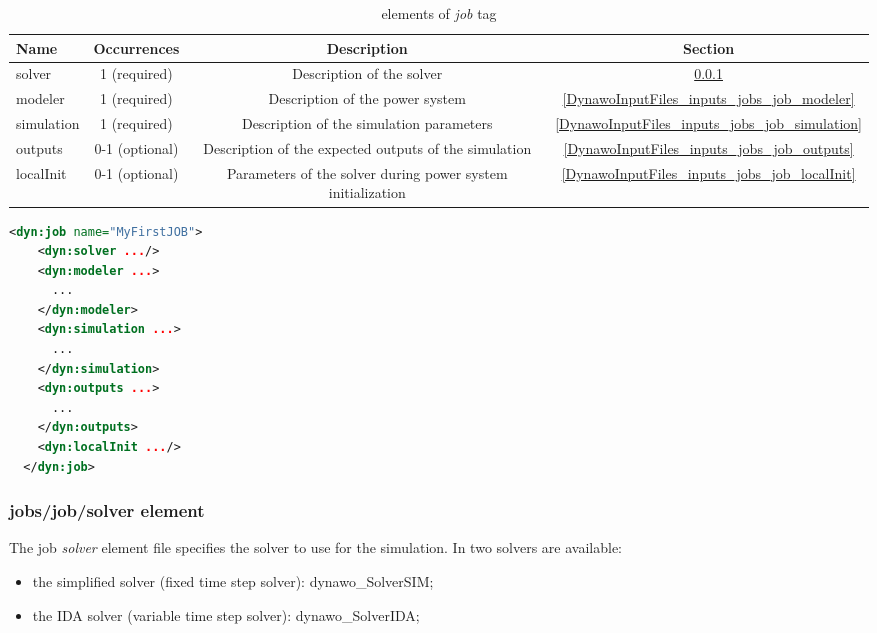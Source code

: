 \documentclass[a4paper, 12pt]{report}
\begin{document}
\begin{table}[H]
\center
\begin{tabular}{ l | c | c | c }
\toprule
\textbf{{Name}} & \textbf{{Occurrences}} & \textbf{{Description}}& \textbf{{Section}}\\
\midrule
\rowcolor{white}
\small{solver} & \small{1 (required)} & \small{Description of the solver}  & \ref{DynawoInputFiles_inputs_jobs_job_solver}\\
\rowcolor{gray!10}
\small{modeler} & \small{1 (required)} & \small{Description of the power system}  & \ref{DynawoInputFiles_inputs_jobs_job_modeler}\\
\rowcolor{white}
\small{simulation} & \small{1 (required)} & \small{Description of the simulation parameters}  &  \ref{DynawoInputFiles_inputs_jobs_job_simulation}\\
\rowcolor{gray!10}
\small{outputs} & \small{0-1 (optional)} & \small{Description of the expected outputs of the simulation}  &  \ref{DynawoInputFiles_inputs_jobs_job_outputs}\\
\rowcolor{white}
\small{localInit} & \small{0-1 (optional)} & \small{Parameters of the solver during power system initialization}  & \ref{DynawoInputFiles_inputs_jobs_job_localInit}\\
\bottomrule
\end{tabular}
\caption{elements of \textit{job} tag}
\end{table}

\begin{lstlisting}[language=XML, morekeywords={name}]
  <dyn:job name="MyFirstJOB">
    <dyn:solver .../>
    <dyn:modeler ...>
      ...
    </dyn:modeler>
    <dyn:simulation ...>
      ...
    </dyn:simulation>
    <dyn:outputs ...>
      ...
    </dyn:outputs>
    <dyn:localInit .../>
  </dyn:job>
\end{lstlisting}

\subsubsection{jobs/job/solver element}
\label{DynawoInputFiles_inputs_jobs_job_solver}

The job \textit{solver} element file specifies the solver to use for the simulation. In \Dynawo two solvers are available:
\begin{itemize}
\item the simplified solver (fixed time step solver): dynawo\_SolverSIM;
\item the IDA solver (variable time step solver): dynawo\_SolverIDA;
\end{itemize}
\end{document}
